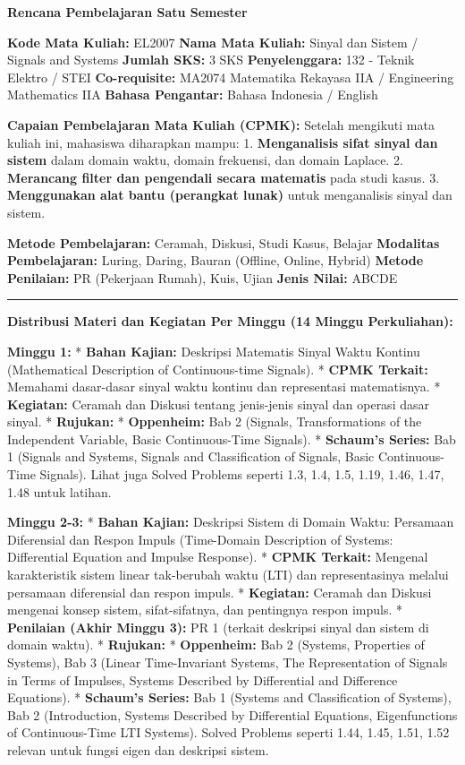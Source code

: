 \documentclass[
  letterpaper,
  DIV=11,
  numbers=noendperiod]{scrreprt}
\begin{document}
\textbf{Rencana Pembelajaran Satu Semester}

\textbf{Kode Mata Kuliah:} EL2007 \textbf{Nama Mata Kuliah:} Sinyal dan
Sistem / Signals and Systems \textbf{Jumlah SKS:} 3 SKS
\textbf{Penyelenggara:} 132 - Teknik Elektro / STEI
\textbf{Co-requisite:} MA2074 Matematika Rekayasa IIA / Engineering
Mathematics IIA \textbf{Bahasa Pengantar:} Bahasa Indonesia / English

\textbf{Capaian Pembelajaran Mata Kuliah (CPMK):} Setelah mengikuti mata
kuliah ini, mahasiswa diharapkan mampu: 1. \textbf{Menganalisis sifat
sinyal dan sistem} dalam domain waktu, domain frekuensi, dan domain
Laplace. 2. \textbf{Merancang filter dan pengendali secara matematis}
pada studi kasus. 3. \textbf{Menggunakan alat bantu (perangkat lunak)}
untuk menganalisis sinyal dan sistem.

\textbf{Metode Pembelajaran:} Ceramah, Diskusi, Studi Kasus, Belajar
\textbf{Modalitas Pembelajaran:} Luring, Daring, Bauran (Offline,
Online, Hybrid) \textbf{Metode Penilaian:} PR (Pekerjaan Rumah), Kuis,
Ujian \textbf{Jenis Nilai:} ABCDE

\begin{center}\rule{0.5\linewidth}{0.5pt}\end{center}

\textbf{Distribusi Materi dan Kegiatan Per Minggu (14 Minggu
Perkuliahan):}

\textbf{Minggu 1:} * \textbf{Bahan Kajian:} Deskripsi Matematis Sinyal
Waktu Kontinu (Mathematical Description of Continuous-time Signals). *
\textbf{CPMK Terkait:} Memahami dasar-dasar sinyal waktu kontinu dan
representasi matematisnya. * \textbf{Kegiatan:} Ceramah dan Diskusi
tentang jenis-jenis sinyal dan operasi dasar sinyal. * \textbf{Rujukan:}
* \textbf{Oppenheim:} Bab 2 (Signals, Transformations of the Independent
Variable, Basic Continuous-Time Signals). * \textbf{Schaum's Series:}
Bab 1 (Signals and Systems, Signals and Classification of Signals, Basic
Continuous-Time Signals). Lihat juga Solved Problems seperti 1.3, 1.4,
1.5, 1.19, 1.46, 1.47, 1.48 untuk latihan.

\textbf{Minggu 2-3:} * \textbf{Bahan Kajian:} Deskripsi Sistem di Domain
Waktu: Persamaan Diferensial dan Respon Impuls (Time-Domain Description
of Systems: Differential Equation and Impulse Response). * \textbf{CPMK
Terkait:} Mengenal karakteristik sistem linear tak-berubah waktu (LTI)
dan representasinya melalui persamaan diferensial dan respon impuls. *
\textbf{Kegiatan:} Ceramah dan Diskusi mengenai konsep sistem,
sifat-sifatnya, dan pentingnya respon impuls. * \textbf{Penilaian (Akhir
Minggu 3):} PR 1 (terkait deskripsi sinyal dan sistem di domain waktu).
* \textbf{Rujukan:} * \textbf{Oppenheim:} Bab 2 (Systems, Properties of
Systems), Bab 3 (Linear Time-Invariant Systems, The Representation of
Signals in Terms of Impulses, Systems Described by Differential and
Difference Equations). * \textbf{Schaum's Series:} Bab 1 (Systems and
Classification of Systems), Bab 2 (Introduction, Systems Described by
Differential Equations, Eigenfunctions of Continuous-Time LTI Systems).
Solved Problems seperti 1.44, 1.45, 1.51, 1.52 relevan untuk fungsi
eigen dan deskripsi sistem.
\end{document}
